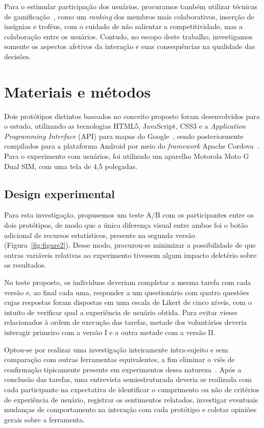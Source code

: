 \documentclass{sigchi}
\begin{document}
Para o estimular participação dos usuários, procuramos também utilizar técnicas de gamificação~\cite{deterding:2011}, como um \textit{ranking} dos membros mais colaborativos, inserção de insígnias e troféus, com o cuidado de não salientar a competitividade, mas a colaboração entre os usuários. Contudo, no escopo deste trabalho, investigamos somente os aspectos afetivos da interação e suas consequências na qualidade das decisões. 


\section{Materiais e métodos}
Dois protótipos distintos baseados no conceito proposto foram desenvolvidos para o estudo, utilizando as tecnologias HTML5, JavaScript, CSS3 e a \textit{Application Programming Interface} (API) para mapas do Google~\cite{googlemaps:2016}, sendo posteriormente compilados para a plataforma Android por meio do \textit{framework} Apache Cordova~\cite{cordova:2016}. Para o experimento com usuários, foi utilizado um aparelho Motorola Moto G Dual SIM, com uma tela de 4,5 polegadas.

\subsection{Design experimental}
Para esta investigação, propusemos um teste A/B com os participantes entre os dois protótipos, de modo que a única diferença visual entre ambos foi o botão adicional de recursos estatísticos, presente na segunda versão (Figura~\ref{fig:figure2}). Desse modo, procurou-se minimizar a possibilidade de que outras variáveis relativas ao experimento tivessem algum impacto deletério sobre os resultados.

No teste proposto, os indivíduos deveriam completar a mesma tarefa com cada versão e, ao final cada uma, responder a um questionário com quatro questões cujas respostas foram dispostas em uma escala de Likert de cinco níveis, com o intuito de verificar qual a experiência de usuário obtida. Para evitar vieses relacionados à ordem de execução das tarefas, metade dos voluntários deveria interagir primeiro com a versão I e a outra metade com a versão II.

Optou-se por realizar uma investigação inteiramente intra-sujeito e sem comparação com outras ferramentas equivalentes, a fim eliminar o viés de confirmação tipicamente presente em experimentos dessa natureza~\cite{dell:2012}. Após a conclusão das tarefas, uma entrevista semiestruturada deveria se realizada com cada participante na expectativa de identificar o cumprimento ou não de critérios de experiência de usuário, registrar os sentimentos relatados, investigar eventuais mudanças de comportamento na interação com cada protótipo e coletar opiniões gerais sobre a ferramenta.
\end{document}
